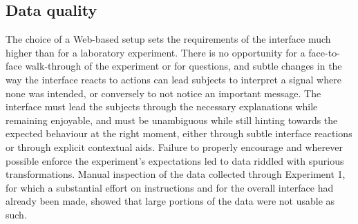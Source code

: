 \documentclass[a4paper,fleqn]{cas-dc}
\begin{document}
\subsection{Data quality}\label{data-quality}

The choice of a Web-based setup sets the requirements of the interface
much higher than for a laboratory experiment. There is no opportunity
for a face-to-face walk-through of the experiment or for questions, and
subtle changes in the way the interface reacts to actions can lead
subjects to interpret a signal where none was intended, or conversely to
not notice an important message.
The interface must lead the subjects through the
necessary explanations while remaining enjoyable, and must be
unambiguous while still hinting towards the expected behaviour at the
right moment, either through subtle interface reactions or through
explicit contextual aids.
Failure to properly encourage and wherever possible enforce the
experiment's expectations led to data riddled with spurious
transformations. Manual inspection of the data collected through
Experiment 1, for which a substantial effort on instructions and for the
overall interface had already been made, showed that large portions of
the data were not usable as such.
\end{document}
